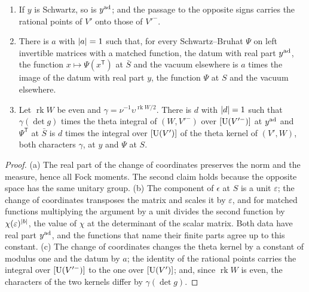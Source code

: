 \begin{lemma}\label{lem:adjoint-data}
\begin{enumerate}[label=\textup{(\alph*)}]
\item If $y$ is Schwartz, so is $y^{\rm ad}$; and the passage to the opposite signs carries the rational points of $V'$ onto those of $V'^-$.
\item There is $a$ with $\lvert a\rvert=1$ such that, for every Schwartz--Bruhat $\Psi$ on left invertible matrices with a matched function, the datum with real part $y^{\rm ad}$, the function $x\mapsto\Psi(x^{\mathsf T})$ at $\bar S$ and
the vacuum elsewhere is $a$ times the image of the datum with real part $y$, the function $\Psi$ at $S$ and the vacuum elsewhere.
\item Let $\operatorname{rk}W$ be even and $\gamma=\nu^{-1}\upsilon^{\operatorname{rk}W/2}$. There is $d$ with $\lvert d\rvert=1$ such that $\gamma(\det g)$ times the theta integral of $(W,V'^-)$ over $[\operatorname{U}(V'^-)]$ at $y^{\rm ad}$ and
$\Psi^{\mathsf T}$ at $\bar S$ is $d$ times the integral over $[\operatorname{U}(V')]$ of the theta kernel of $(V',W)$, both characters $\gamma$, at $y$ and $\Psi$ at $S$.
\end{enumerate}
\end{lemma}

\begin{proof}
(a) The real part of the change of coordinates preserves the norm and the measure, hence all Fock moments. The second claim holds because the opposite space has the same unitary group. (b) The component of $\epsilon$
at $S$ is a unit $\varepsilon$; the change of coordinates transposes the matrix and scales it by $\varepsilon$, and for matched functions multiplying the argument by a unit divides the second function by
$\chi(\varepsilon)^{\lvert b\rvert}$, the value of $\chi$ at the determinant of the scalar matrix. Both data have real part $y^{\rm ad}$, and the functions that name their finite parts agree up to this constant. (c) The
change of coordinates changes the theta kernel by a constant of modulus one and the datum by $a$; the identity of the rational points carries the integral over $[\operatorname{U}(V'^-)]$ to the one over $[\operatorname{U}(V')]$; and, since
$\operatorname{rk}W$ is even, the characters of the two kernels differ by $\gamma(\det g)$.
\end{proof}


